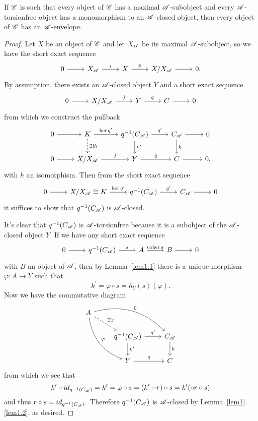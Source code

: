 \documentclass[dissertation.tex]{subfiles}
\begin{document}
\begin{lem}\label{lem3}
  If $\mathscr{C}$ is such that every object of $\mathscr{C}$ has a maximal $\mathscr{A}$-subobject and every $\mathscr{A}$-torsionfree object has a monomorphism to an $\mathscr{A}$-closed object, then every object of $\mathscr{C}$ has an $\mathscr{A}$-envelope.
  \begin{proof}
    Let $X$ be an object of $\mathscr{C}$ and let $X_{\mathscr{A}}$ be its maximal $\mathscr{A}$-subobject, so we have the short exact sequence
    $$\begin{tikzcd}
      0 \arrow{r}& X_\A \arrow{r}{i} & X \arrow{r}{p} & X/X_\A \arrow{r} & 0.
    \end{tikzcd}$$
    By assumption, there exists an $\mathscr{A}$-closed object $Y$ and a short exact sequence
    $$\begin{tikzcd}
      0 \arrow{r} & X/X_\A \arrow{r}{j} & Y \arrow{r}{q} & C \arrow{r} & 0
    \end{tikzcd}$$
    from which we construct the pullback
    $$\begin{tikzcd}
      0 \arrow{r} & K \arrow[dashed]{d}{\exists !h}\arrow{r}{\ker{q^\prime}} & q^{-1}(C_\A) \arrow{r}{q^\prime} \arrow{d}{k^\prime} & C_\A\arrow{d}{k} \arrow{r}&0\\
      0 \arrow{r} & X/X_\A \arrow{r}{j} & Y \arrow{r}{q} & C \arrow{r} & 0,
    \end{tikzcd}$$
    with $h$ an isomorphism.
    Then from the short exact sequence 
    $$\begin{tikzcd}
      0 \arrow{r} & X/X_\A \cong K \arrow{r}{\ker{q^\prime}} & q^{-1}(C_\A) \arrow{r}{q^\prime} & C_\A\arrow{r} & 0
    \end{tikzcd}$$
    it suffices to show that $q^{-1}(C_{\mathscr{A}})$ is $\mathscr{A}$-closed.
    
    It's clear that $q^{-1}(C_{\mathscr{A}})$ is $\mathscr{A}$-torsionfree because it is a subobject of the $\mathscr{A}$-closed object $Y$.
    If we have any short exact sequence
    $$\begin{tikzcd}
      0 \arrow{r} & q^{-1}(C_\A) \arrow{r}{s} & A \arrow{r}{\coker{s}} & B \arrow{r} & 0
    \end{tikzcd}$$
    with $B$ an object of $\mathscr{A}$, then by Lemma~\ref{lem1.1} there is a unique morphism $\varphi : A \rightarrow Y$ such that 
    $$k^\prime = \varphi \circ s = h_Y(s)(\varphi).$$
    Now we have the commutative diagram
    $$\begin{tikzcd}
      A \arrow[dashed]{rd}{\exists ! r} \arrow[bend right]{ddr}{\varphi} \arrow[bend left]{rrd}{0}\\
      & q^{-1}(C_\A) \arrow{r}{q^\prime} \arrow{d}{k^\prime} & C_\A \arrow{d}{k}\\
      & Y \arrow{r}{q} & C
    \end{tikzcd}$$
    from which we see that 
    $$k^\prime \circ id_{q^{-1}(C_{\mathscr{A}})} = k^\prime = \varphi \circ s = (k^\prime \circ r) \circ s = k^\prime (\circ r \circ s)$$
    and thus $r \circ s = id_{q^{-1}(C_{\mathscr{A}})}.$
    Therefore $q^{-1}(C_{\mathscr{A}})$ is $\mathscr{A}$-closed by Lemma~\ref{lem1}.\ref{lem1.2}, as desired.
  \end{proof}
\end{lem}
\end{document}
